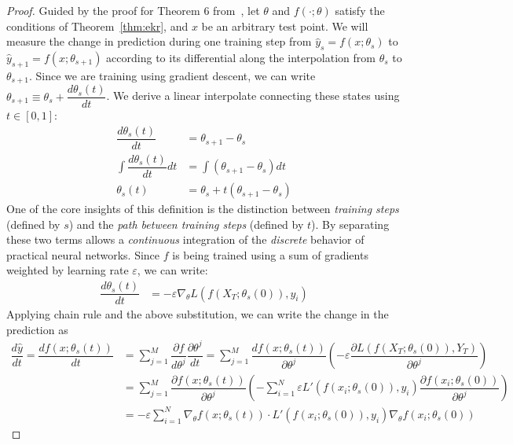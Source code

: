 \begin{proof}
Guided by the proof for Theorem 6 from~\citet{bell2023}, let $\theta$ and $f(\cdot; \theta)$ satisfy the conditions of Theorem~\ref{thm:ekr}, and $x$ be an arbitrary test point. We will measure the change in prediction during one training step from $\hat y_s = f(x; \theta_s)$ to $\hat y_{s+1} = f(x; \theta_{s+1})$ according to its differential along the interpolation from $\theta_s$ to $\theta_{s+1}$. Since we are training using gradient descent, we can write $\theta_{s+1} \equiv \theta_s + \dfrac{d \theta_s(t)}{dt} $. We derive a linear interpolate connecting these states using $t \in [0, 1]$:
\begin{align}
    \dfrac{d \theta_s(t)}{dt} &= \theta_{s+1} - \theta_s\\   
    \int \dfrac{d \theta_s(t)}{dt} dt &= \int (\theta_{s+1} - \theta_s)dt\\
    \theta_s(t) &= \theta_s + t(\theta_{s+1} - \theta_s)
\end{align}
One of the core insights of this definition is the distinction between \textit{training steps} (defined by $s$) and the \textit{path between training steps} (defined by $t$).
By separating these two terms allows a \textit{continuous} integration of the \textit{discrete} behavior of practical neural networks.
Since $f$ is being trained using a sum of gradients weighted by learning rate $\varepsilon$, we can write:
\begin{align}
    \dfrac{d \theta_s(t)}{dt} &= -\varepsilon  \nabla_\theta  L(f(X_T; \theta_s(0)), y_i) %
\end{align}
Applying chain rule and the above substitution, we can write the change in the prediction as 
\begin{align}
    \dfrac{d \hat y}{dt} = \dfrac{d f(x; \theta_s(t))}{dt} &= \sum_{j = 1}^{M} \dfrac{\partial f}{d \theta^j} \dfrac{\partial \theta^j}{dt} = \sum_{j = 1}^{M} \dfrac{d f(x; \theta_s(t))}{\partial \theta^j} \left(-\varepsilon  \dfrac{\partial L(f(X_T; \theta_s(0)),  Y_T)}{\partial \theta^j}\right)\\
&= \sum_{j = 1}^{M} \dfrac{\partial f(x; \theta_s(t))}{\partial \theta^j} \left(- \sum_{i = 1}^{N}\varepsilon L'(f(x_i; \theta_s(0)), y_i) \dfrac{\partial  f(x_i; \theta_s(0))}{\partial \theta^j}\right)\\
&= - \varepsilon \sum_{i = 1}^{N}  \nabla_\theta f(x; \theta_s(t)) \cdot L'(f(x_i; \theta_s(0)), y_i)  \nabla_\theta f(x_i; \theta_s(0))

\end{align}
\end{proof}
